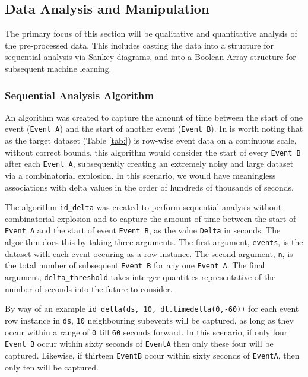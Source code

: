 \documentclass[11pt,]{article}
\begin{document}
\hypertarget{data-analysis-and-manipulation}{%
\subsection{Data Analysis and
Manipulation}\label{data-analysis-and-manipulation}}

The primary focus of this section will be qualitative and quantitative
analysis of the pre-processed data. This includes casting the data into
a structure for sequential analysis via Sankey diagrams, and into a
Boolean Array structure for subsequent machine learning.

\hypertarget{sequential-analysis-algorithm}{%
\subsubsection{Sequential Analysis
Algorithm}\label{sequential-analysis-algorithm}}

An algorithm was created to capture the amount of time between the start
of one event (\texttt{Event\ A}) and the start of another event
(\texttt{Event\ B}). In is worth noting that as the target dataset
(Table \ref{tab:}) is row-wise event data on a continuous scale, without
correct bounds, this algorithm would consider the start of every
\texttt{Event\ B} after each \texttt{Event\ A}, subsequently creating an
extremely noisy and large dataset via a combinatorial explosion. In this
scenario, we would have meaningless associations with delta values in
the order of hundreds of thousands of seconds.

The algorithm \texttt{id\_delta} was created to perform sequential
analysis without combinatorial explosion and to capture the amount of
time between the start of \texttt{Event\ A} and the start of event
\texttt{Event\ B}, as the value \texttt{Delta} in seconds. The algorithm
does this by taking three arguments. The first argument,
\texttt{events}, is the dataset with each event occuring as a row
instance. The second argument, \texttt{n}, is the total number of
subsequent \texttt{Event\ B} for any one \texttt{Event\ A}. The final
argument, \texttt{delta\_threshold} takes interger quantities
representative of the number of seconds into the future to consider.

By way of an example \texttt{id\_delta(ds,\ 10,\ dt.timedelta(0,-60))}
for each event row instance in \texttt{ds}, \texttt{10} neighbouring
subevents will be captured, as long as they occur within a range of
\texttt{0} till \texttt{60} seconds forward. In this scenario, if only
four \texttt{Event\ B} occur within sixty seconds of \texttt{EventA}
then only these four will be captured. Likewise, if thirteen
\texttt{EventB} occur within sixty seconds of \texttt{EventA}, then only
ten will be captured.
\end{document}
